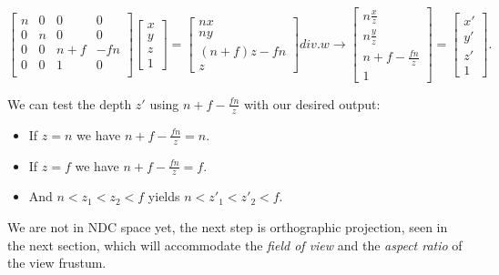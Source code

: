 \documentclass[cic,tc,english]{iiufrgs}
\begin{document}
\begin{equation}
    \begin{bmatrix}
        n & 0 & 0 & 0       \\
        0 & n & 0 & 0       \\
        0 & 0 & n + f & -fn \\
        0 & 0 & 1 & 0       \\
    \end{bmatrix}
    \begin{bmatrix}
        x \\
        y \\
        z \\
        1
    \end{bmatrix}
    =
    \begin{bmatrix}
        nx            \\
        ny            \\
        (n + f)z - fn \\
        z
    \end{bmatrix}
     div. w \rightarrow
    \begin{bmatrix}
        n\frac{x}{z}         \\
        n \frac{y}{z}        \\
        n + f - \frac{fn}{z} \\
        1
    \end{bmatrix}
    =
    \begin{bmatrix}
        x' \\
        y' \\
        z' \\
        1
    \end{bmatrix}
    \label{secondtprojectionmatrix}
    .
\end{equation}

We can test the depth $z'$ using $n + f - \frac{fn}{z}$ with our desired output:

\begin{itemize}
    \item If $z = n$ we have $n + f - \frac{fn}{z} = n$.
    \item If $z = f$ we have $n + f - \frac{fn}{z} = f$.
    \item And $n < z_1 < z_2 < f$ yields $n < z'_1 < z'_2 < f$.
\end{itemize}

We are not in NDC space yet, the next step is orthographic projection, seen in the next section, which will accommodate the \textit{field of view} and the \textit{aspect ratio} of the view frustum.
\end{document}
